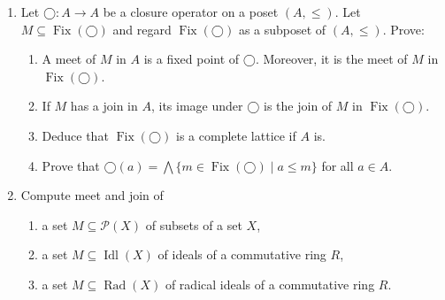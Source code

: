 \documentclass{exercises}
\DeclareMathOperator{\Idl}{Idl}
\DeclareMathOperator{\Rad}{Rad}
\DeclareMathOperator{\Fix}{Fix}
\begin{document}
\begin{exercise}
\begin{enumerate}
    \item Let $◯:A → A$ be a closure operator on a poset $(A,≤)$.
    Let $M⊆\Fix(◯)$ and regard $\Fix(◯)$ as a subposet of $(A,≤)$.
      Prove:
      \begin{enumerate}
        \item A meet of $M$ in $A$ is a fixed point of $◯$.
          Moreover, it is the meet of $M$ in $\Fix(◯)$.
        \item If $M$ has a join in $A$, its image under $◯$ is the join of $M$ in $\Fix(◯)$.
        \item Deduce that $\Fix(◯)$ is a complete lattice if $A$ is.
        \item Prove that $◯(a) = ⋀ \{m ∈ \Fix(◯) \mid a ≤ m\}$ for all $a ∈ A$.
      \end{enumerate}
    \item Compute meet and join of
      \begin{enumerate}
        \item a set $M⊆𝒫(X)$ of subsets of a set $X$,
        \item a set $M⊆\Idl(X)$ of ideals of a commutative ring $R$,
        \item a set $M⊆\Rad(X)$ of radical ideals of a commutative ring $R$.
      \end{enumerate}
  \end{enumerate}
\end{exercise}
\end{document}
